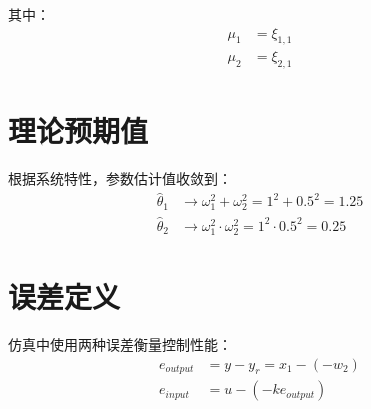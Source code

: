 \documentclass{article}
\begin{document}
其中：
\begin{align}
\mu_1 &= \xi_{1,1} \\
\mu_2 &= \xi_{2,1}
\end{align}

\section{理论预期值}

根据系统特性，参数估计值收敛到：
\begin{align}
\hat{\theta}_1 &\rightarrow \omega_1^2 + \omega_2^2 = 1^2 + 0.5^2 = 1.25 \\
\hat{\theta}_2 &\rightarrow \omega_1^2 \cdot \omega_2^2 = 1^2 \cdot 0.5^2 = 0.25
\end{align}

\section{误差定义}

仿真中使用两种误差衡量控制性能：
\begin{align}
e_{output} &= y - y_r = x_1 - (-w_2) \\
e_{input} &= u - (-ke_{output})
\end{align}
\end{document}
